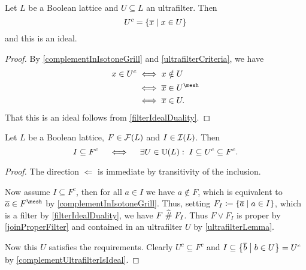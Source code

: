 \begin{lemma} \label{complementUltrafilterIsIdeal}
Let $L$ be a Boolean lattice and $U\subseteq L$ an ultrafilter. Then
\[ U^c = \setbuilder{\overline{x}}{x\in U} \]
and this is an ideal.
\end{lemma}
\begin{proof}
By \ref{complementInIsotoneGrill} and \ref{ultrafilterCriteria}, we have
\begin{align*}
x \in U^c &\iff x \notin U \\
&\iff \overline{x} \in U^\mesh \\
&\iff \overline{x} \in U.
\end{align*}
That this is an ideal follows from \ref{filterIdealDuality}.
\end{proof}

\begin{lemma} \label{idealFromUltrafilter}
Let $L$ be a Boolean lattice, $F\in \operatorname{\mathcal{F}}(L)$ and $I\in \operatorname{\mathcal{I}}(L)$. Then
\[ I \subseteq F^c \quad\iff\quad \exists U\in \operatorname{\mathbb{U}}(L): \; I \subseteq U^c \subseteq F^c. \]
\end{lemma}
\begin{proof}
The direction $\Leftarrow$ is immediate by transitivity of the inclusion.

Now assume $I \subseteq F^c$, then for all $a\in I$ we have $a\notin F$, which is equivalent to $\overline{a}\in F^\mesh$ by \ref{complementInIsotoneGrill}. Thus, setting $F_I \defeq \setbuilder{\overline{a}}{a\in I}$, which is a filter by \ref{filterIdealDuality}, we have $F \mathrel{\widehat{\#}} F_I$. Thus $F\vee F_I$ is proper by \ref{joinProperFilter} and contained in an ultrafilter $U$ by \ref{ultrafilterLemma}.

Now this $U$ satisfies the requirements. Clearly $U^c\subseteq F^c$ and $I \subseteq \setbuilder{\overline{b}}{b\in U} = U^c$ by \ref{complementUltrafilterIsIdeal}.
\end{proof}

